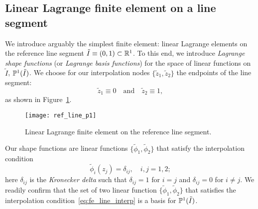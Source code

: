 \subsection{Linear Lagrange finite element on a line segment}
\label{sec:fe_lin_line}
We introduce arguably the simplest finite element: linear Lagrange elements on the reference line segment $\tilde I \equiv (0,1) \subset \mathbb{R}^1$.  To this end, we introduce \emph{Lagrange shape functions} (or \emph{Lagrange basis functions}) for the space of linear functions on $\tilde I$, $\mathbb{P}^1(\tilde I)$.
We choose for our interpolation nodes $\{\tilde z_1, \tilde z_2\}$ the endpoints of the line segment:
\begin{equation*}
  \tilde z_1 \equiv 0 \quad \text{and} \quad \tilde z_2 \equiv 1,
\end{equation*}
as shown in Figure~\ref{fig:fe_ref_line_p1}.
  \begin{figure}
    \centering
    \texttt{[image: ref\_line\_p1]}
    \caption{Linear Lagrange finite element on the reference line segment.}
    \label{fig:fe_ref_line_p1}
\end{figure}
Our shape functions are linear functions $\{\tilde \phi_1, \tilde \phi_2\}$ that satisfy the interpolation condition
\begin{equation}
  \tilde \phi_i(z_j) = \delta_{ij}, \quad i,j = 1,2;  \label{eq:fe_line_interp}
\end{equation}
here $\delta_{ij}$ is the \emph{Kronecker delta} such that $\delta_{ij} = 1$ for $i = j$ and $\delta_{ij} = 0$ for $i \neq j$. We readily confirm that the set of two linear function $\{\tilde \phi_1,\tilde \phi_2\}$ that satisfies the interpolation condition~\eqref{eq:fe_line_interp} is a basis for $\mathbb{P}^1(\tilde I)$.

